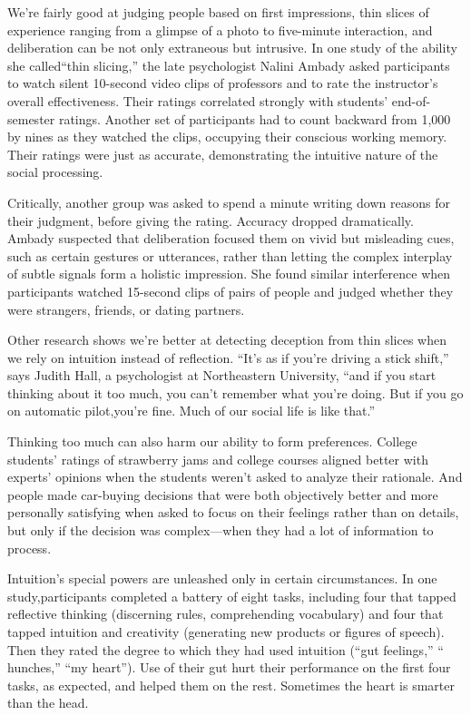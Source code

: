 We're fairly good at judging people based on first impressions, thin slices of experience ranging from a glimpse of a photo to five-minute interaction, and deliberation can be not only extraneous but intrusive. In one study of the ability she called``thin slicing,'' the late psychologist Nalini Ambady asked participants to watch silent 10-second video clips of professors and to rate the instructor's overall effectiveness. Their ratings correlated strongly with students' end-of-semester ratings. Another set of participants had to count backward from 1,000 by nines as they watched the clips, occupying their conscious working memory. Their ratings were just as accurate, demonstrating the intuitive nature of the social processing.


Critically, another group was asked to spend a minute writing down reasons for their judgment, before giving the rating. Accuracy dropped dramatically. Ambady suspected that deliberation focused them on vivid but misleading cues, such as certain gestures or utterances, rather than letting the complex interplay of subtle signals form a holistic impression. She found similar interference when participants watched 15-second clips of pairs of people and judged whether they were strangers, friends, or dating partners.


Other research shows we're better at detecting deception from thin slices when we rely on intuition instead of reflection. ``It's as if you're driving a stick shift,'' says Judith Hall, a psychologist at Northeastern University, ``and if you start thinking about it too much, you can't remember what you're doing. But if you go on automatic pilot,you're fine. Much of our social life is like that.''


Thinking too much can also harm our ability to form preferences. College students' ratings of strawberry jams and college courses aligned better with experts' opinions when the students weren't asked to analyze their rationale. And people made car-buying decisions that were both objectively better and more personally satisfying when asked to focus on their feelings rather than on details, but only if the decision was complex—when they had a lot of information to process.


Intuition's special powers are unleashed only in certain circumstances. In one study,participants completed a battery of eight tasks, including four that tapped reflective thinking (discerning rules, comprehending vocabulary) and four that tapped intuition and creativity (generating new products or figures of speech). Then they rated the degree to which they had used intuition (``gut feelings,'' `` hunches,'' ``my heart''). Use of their gut hurt their performance on the first four tasks, as expected, and helped them on the rest. Sometimes the heart is smarter than the head.